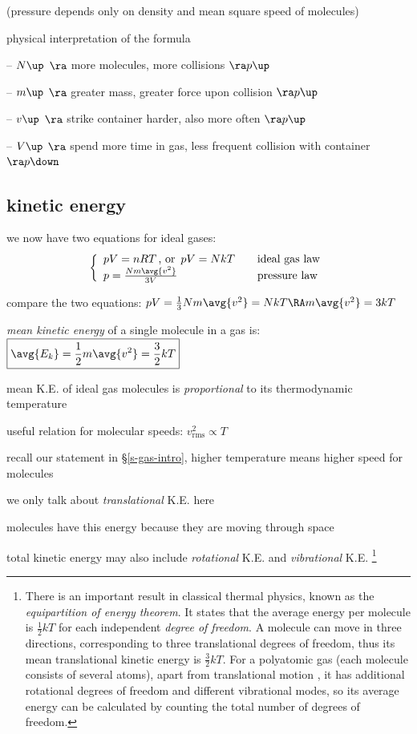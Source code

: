 (pressure depends only on density and mean square speed of molecules)

\cmt physical interpretation of the formula

\begin{compactitem}
\item[--] $N \up$ $\ra$ more molecules, more collisions $\ra p\up$

\item[--] $m \up$ $\ra$ greater mass, greater force upon collision $\ra p\up$

\item[--] $v \up$ $\ra$ strike container harder, also more often $\ra p\up$

\item[--] $V \up$ $\ra$ spend more time in gas, less frequent collision with container $\ra p\down$
\end{compactitem}


\subsection{kinetic energy}

we now have two equations for ideal gases:
\begin{equation*}
\left\{
	\begin{array}{ll}
	pV = nRT \, \text{, or } \, pV = NkT &\quad \text{ideal gas law} \\
	p = \frac{Nm\avg{v^2}}{3V} &\quad \text{pressure law}
	\end{array} \right.
\end{equation*}

compare the two equations: $pV=\frac{1}{3}Nm\avg{v^2}=NkT \RA m\avg{v^2}=3kT$

\emph{mean kinetic energy} of a single molecule in a gas is: $\boxed{\avg{E_k}=\frac{1}{2}m\avg{v^2}=\frac{3}{2}kT}$

mean K.E. of ideal gas molecules is \emph{proportional} to its thermodynamic temperature

\cmt useful relation for molecular speeds: $\boxed{v_\text{rms}^2 \propto T}$

recall our statement in \S\ref{s-gas-intro}, higher temperature means higher speed for molecules

\cmt we only talk about \emph{translational} K.E. here

molecules have this energy because they are moving through space

total kinetic energy may also include \emph{rotational} K.E. and \emph{vibrational} K.E.
\footnote{There is an important result in classical thermal physics, known as the \emph{equipartition of energy theorem}. It states that the average energy per molecule is $\frac{1}{2}kT$ for each independent \emph{degree of freedom}. A molecule can move in three directions, corresponding to three translational degrees of freedom, thus its mean translational kinetic energy is $\frac{3}{2}kT$. For a polyatomic gas (each molecule consists of several atoms), apart from translational motion , it has additional rotational degrees of freedom and different vibrational modes, so its average energy can be calculated by counting the total number of degrees of freedom.}

